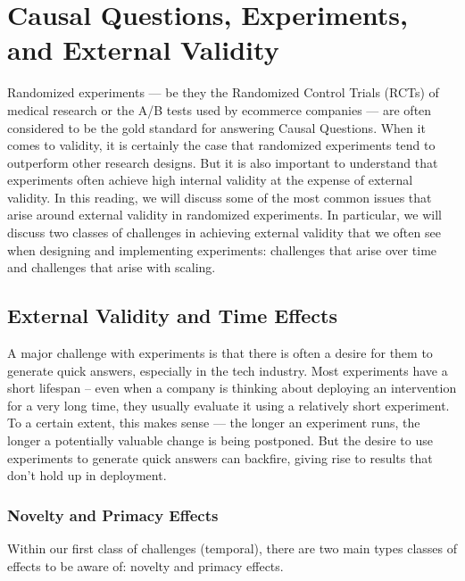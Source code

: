\documentclass[letterpaper,10pt,english]{jupyterBook}
\begin{document}
\chapter{Causal Questions, Experiments, and External Validity}
\label{\detokenize{30_questions/45_causal_questions_external:causal-questions-experiments-and-external-validity}}\label{\detokenize{30_questions/45_causal_questions_external::doc}}
\sphinxAtStartPar
Randomized experiments — be they the Randomized Control Trials (RCTs) of medical research or the A/B tests used by e\sphinxhyphen{}commerce companies — are often considered to be the gold standard for answering Causal Questions. When it comes to  validity, it is certainly the case that randomized experiments tend to outperform other research designs. But it is also important to understand that experiments often achieve high internal validity at the expense of external validity. In this reading, we will discuss some of the most common issues that arise around external validity in randomized experiments. In particular, we will discuss two classes of challenges in achieving external validity that we often see when designing and implementing experiments: challenges that arise over time and challenges that arise with scaling.


\section{External Validity and Time Effects}
\label{\detokenize{30_questions/45_causal_questions_external:external-validity-and-time-effects}}
\sphinxAtStartPar
A major challenge with experiments is that there is often a desire for them to generate quick answers, especially in the tech industry. Most experiments have a short lifespan – even when a company is thinking about deploying an intervention for a very long time, they usually evaluate it using a relatively short experiment. To a certain extent, this makes sense — the longer an experiment runs, the longer a potentially valuable change is being postponed. But the desire to use experiments to generate quick answers can backfire, giving rise to results that don’t hold up in deployment.


\subsection{Novelty and Primacy Effects}
\label{\detokenize{30_questions/45_causal_questions_external:novelty-and-primacy-effects}}
\sphinxAtStartPar
Within our first class of challenges (temporal), there are two main types classes of effects to be aware of: novelty and primacy effects.
\end{document}
